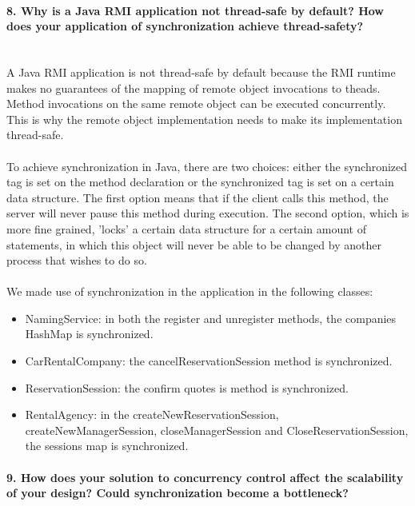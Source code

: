 \documentclass{ds-report}
\begin{document}
	\paragraph{8. Why is a Java RMI application not thread-safe by default? How does your application of synchronization achieve thread-safety?} \mbox{}\\
A Java RMI application is not thread-safe by default because the RMI runtime makes no guarantees of the mapping of remote object invocations to theads. Method invocations on the same remote object can be executed concurrently. This is why the remote object implementation needs to make its implementation thread-safe.\\\\
To achieve synchronization in Java, there are two choices: either the synchronized tag is set on the method declaration or the synchronized tag is set on a certain data structure. The first option means that if the client calls this method, the server will never pause this method during execution. The second option, which is more fine grained, 'locks' a certain data structure for a certain amount of statements, in which this object will never be able to be changed by another process that wishes to do so.\\\\
We made use of synchronization in the application in the following classes:
\begin{itemize}
	\item NamingService: in both the register and unregister methods, the companies HashMap is synchronized. 
	\item CarRentalCompany: the cancelReservationSession method is synchronized.
	\item ReservationSession: the confirm quotes is method is synchronized.
	\item RentalAgency: in the createNewReservationSession, createNewManagerSession, closeManagerSession and CloseReservationSession, the sessions map is synchronized.
\end{itemize} 


	\paragraph{9. How does your solution to concurrency control affect the scalability of your design? Could synchronization become a bottleneck?} \mbox{}\\
	

	
	\clearpage
	
	
\end{document}
